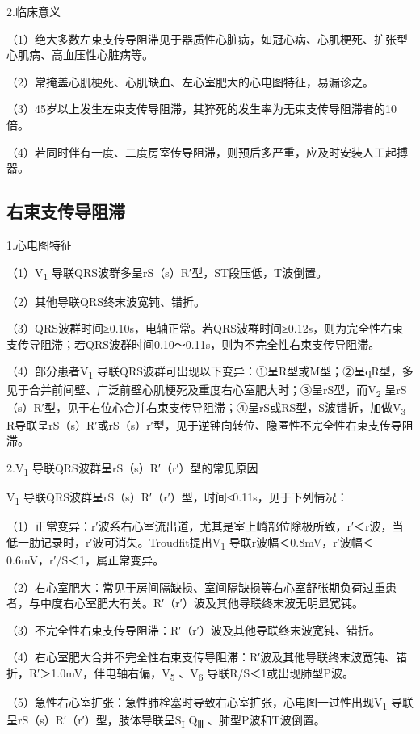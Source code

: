 2.临床意义

（1）绝大多数左束支传导阻滞见于器质性心脏病，如冠心病、心肌梗死、扩张型心肌病、高血压性心脏病等。

（2）常掩盖心肌梗死、心肌缺血、左心室肥大的心电图特征，易漏诊之。

（3）45岁以上发生左束支传导阻滞，其猝死的发生率为无束支传导阻滞者的10倍。

（4）若同时伴有一度、二度房室传导阻滞，则预后多严重，应及时安装人工起搏器。

\protect\hypertarget{text00009.htmlux5cux23subid56}{}{}

\subsection{右束支传导阻滞}

1.心电图特征

（1）V\textsubscript{1} 导联QRS波群多呈rS（s）R′型，ST段压低，T波倒置。

（2）其他导联QRS终末波宽钝、错折。

（3）QRS波群时间≥0.10s，电轴正常。若QRS波群时间≥0.12s，则为完全性右束支传导阻滞；若QRS波群时间0.10～0.11s，则为不完全性右束支传导阻滞。

（4）部分患者V\textsubscript{1}
导联QRS波群可出现以下变异：①呈R型或M型；②呈qR型，多见于合并前间壁、广泛前壁心肌梗死及重度右心室肥大时；③呈rS型，而V\textsubscript{2}
呈rS（s）R′型，见于右位心合并右束支传导阻滞；④呈rS或RS型，S波错折，加做V\textsubscript{3}
R导联呈rS（s）R′或rS（s）r′型，见于逆钟向转位、隐匿性不完全性右束支传导阻滞。

2.V\textsubscript{1} 导联QRS波群呈rS（s）R′（r′）型的常见原因

V\textsubscript{1}
导联QRS波群呈rS（s）R′（r′）型，时间≤0.11s，见于下列情况：

（1）正常变异：r′波系右心室流出道，尤其是室上嵴部位除极所致，r′＜r波，当低一肋记录时，r′波可消失。Troudfit提出V\textsubscript{1}
导联r波幅＜0.8mV，r′波幅＜0.6mV，r′/S＜1，属正常变异。

（2）右心室肥大：常见于房间隔缺损、室间隔缺损等右心室舒张期负荷过重患者，与中度右心室肥大有关。R′（r′）波及其他导联终末波无明显宽钝。

（3）不完全性右束支传导阻滞：R′（r′）波及其他导联终末波宽钝、错折。

（4）右心室肥大合并不完全性右束支传导阻滞：R′波及其他导联终末波宽钝、错折，R′＞1.0mV，伴电轴右偏，V\textsubscript{5}
、V\textsubscript{6} 导联R/S＜1或出现肺型P波。

（5）急性右心室扩张：急性肺栓塞时导致右心室扩张，心电图一过性出现V\textsubscript{1}
导联呈rS（s）R′（r′）型，肢体导联呈S\textsubscript{I} Q\textsubscript{Ⅲ}
、肺型P波和T波倒置。

